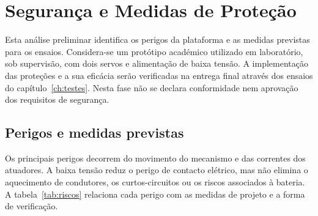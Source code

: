 \chapter{Segurança e Medidas de Proteção}
\label{ch:seguranca}

Esta análise preliminar identifica os perigos da plataforma e as medidas previstas para os ensaios. Considera-se um protótipo académico utilizado em laboratório, sob supervisão, com dois servos e alimentação de baixa tensão. A implementação das proteções e a sua eficácia serão verificadas na entrega final através dos ensaios do capítulo~\ref{ch:testes}. Nesta fase não se declara conformidade nem aprovação dos requisitos de segurança.

\section{Perigos e medidas previstas}
Os principais perigos decorrem do movimento do mecanismo e das correntes dos atuadores. A baixa tensão reduz o perigo de contacto elétrico, mas não elimina o aquecimento de condutores, os curtos-circuitos ou os riscos associados à bateria. A tabela~\ref{tab:riscos} relaciona cada perigo com as medidas de projeto e a forma de verificação.

